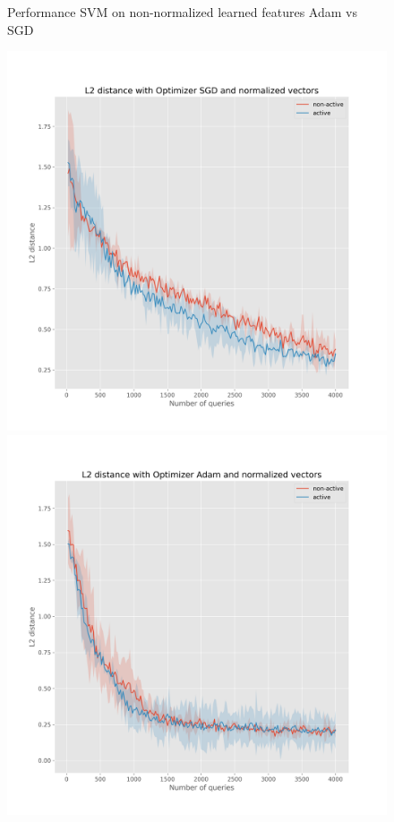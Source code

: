 \documentclass{article}
\begin{document}
\begin{figure}[!h]
\begin{minipage}{.45\textwidth}
  \end{minipage}
  \caption{Performance SVM on non-normalized learned features Adam vs SGD}\label{fig:l2-loss-non-normalized-ci}
\end{figure}

\begin{figure}[!h]
  \centering
  \begin{minipage}{.45\textwidth}
    \centering
    \includegraphics[width=\linewidth]{active-vs-base-moons-l2-loss-SGD-normalized-ci}
  \end{minipage}%
  \begin{minipage}{.45\textwidth}
    \centering
    \includegraphics[width=\linewidth]{active-vs-base-moons-l2-loss-Adam-normalized-ci}

\end{minipage}
\end{figure}
\end{document}
